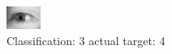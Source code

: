 \begin{figure}[h!]
\begin{center}
\includegraphics[width=0.60\columnwidth]{figures/ID3113_class_3_target_4.png}
\end{center}
\caption{ Classification: 3 actual target: 4}
\label{fig:ID3113_class_3_target_4}
\end{figure}

